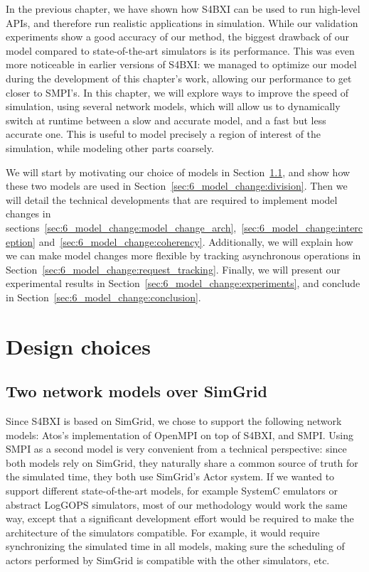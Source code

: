 In the previous chapter, we have shown how S4BXI can be used to run high-level
APIs, and therefore run realistic applications in simulation. While our
validation experiments show a good accuracy of our method, the biggest drawback
of our model compared to state-of-the-art simulators is its performance. This
was even more noticeable in earlier versions of S4BXI: we managed to optimize
our model during the development of this chapter's work, allowing our
performance to get closer to SMPI's. In this chapter, we will explore ways to
improve the speed of simulation, using several network models, which will allow
us to dynamically switch at runtime between a slow and accurate model, and a
fast but less accurate one. This is useful to model precisely a region of
interest of the simulation, while modeling other parts coarsely.

We will start by motivating our choice of models in
Section~\ref{sec:6_model_change:simgrid}, and show how these two models are used
in Section~\ref{sec:6_model_change:division}. Then we will detail the technical
developments that are required to implement model changes in
sections~\ref{sec:6_model_change:model_change_arch},~\ref{sec:6_model_change:interception}
and~\ref{sec:6_model_change:coherency}. Additionally, we will explain how we can
make model changes more flexible by tracking asynchronous operations in
Section~\ref{sec:6_model_change:request_tracking}. Finally, we will present our
experimental results in Section~\ref{sec:6_model_change:experiments}, and
conclude in Section~\ref{sec:6_model_change:conclusion}.

\section{Design choices}

\subsection{Two network models over SimGrid}
\label{sec:6_model_change:simgrid}

Since S4BXI is based on SimGrid, we chose to support the following network
models: Atos's implementation of OpenMPI on top of S4BXI, and SMPI. Using SMPI
as a second model is very convenient from a technical perspective: since both
models rely on SimGrid, they naturally share a common source of truth for the
simulated time, they both use SimGrid's Actor system. If we wanted to support
different state-of-the-art models, for example SystemC emulators or abstract
LogGOPS simulators, most of our methodology would work the same way, except that
a significant development effort would be required to make the architecture of
the simulators compatible. For example, it would require synchronizing the
simulated time in all models, making sure the scheduling of actors performed by
SimGrid is compatible with the other simulators, etc.

